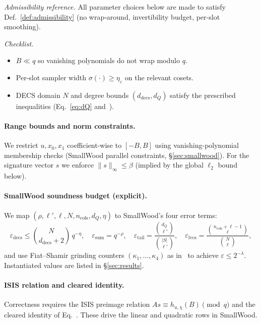 \noindent\emph{Admissibility reference.}
All parameter choices below are made to satisfy Def.~\ref{def:admissibility} (no wrap‑around, invertibility budget, per‑slot smoothing).

\noindent\emph{Checklist.}
\begin{itemize}[leftmargin=1.25em]
  \item $B \ll q$ so vanishing polynomials do not wrap modulo $q$.
  \item Per-slot sampler width $\sigma(\cdot)\ge \eta_\varepsilon$ on the relevant cosets.
  \item DECS domain $N$ and degree bounds $(d_{\mathrm{decs}},d_Q)$ satisfy the prescribed inequalities (Eq.~\eqref{eq:dQ} and~\cite{cryptoeprint:2025/1085}).
\end{itemize}

\paragraph{Range bounds and norm constraints.}
We restrict $u,x_0,x_1$ coefficient-wise to $[-B,B]$ using vanishing-polynomial membership checks (SmallWood parallel constraints, \S\ref{sec:smallwood}). For the signature vector $s$ we enforce $\|s\|_\infty\le \beta$ (implied by the global $\ell_2$ bound below).

\paragraph{SmallWood soundness budget (explicit).}
We map $(\rho,\ell',\ell,N,n_{\mathrm{cols}},d_Q,\eta)$ to SmallWood’s four error terms:
\[
\varepsilon_{\mathrm{decs}}\le \binom{N}{d_{\mathrm{decs}}+2}\,q^{-\eta},\quad
\varepsilon_{\mathrm{sum}}=q^{-\rho},\quad
\varepsilon_{\mathrm{tail}}=\frac{\binom{d_Q}{\ell'}}{\binom{|S|}{\ell'}},\quad
\varepsilon_{\mathrm{lvcs}}=\frac{\binom{n_{\mathrm{cols}}+\ell-1}{\ell}}{\binom{N}{\ell}},
\]
and use Fiat–Shamir grinding counters $(\kappa_1,\dots,\kappa_4)$ as in~\cite{cryptoeprint:2025/1085} to achieve $\varepsilon\le 2^{-\lambda}$. Instantiated values are listed in \S\ref{sec:results}.

\paragraph{ISIS relation and cleared identity.}
Correctness requires the ISIS preimage relation $A s\equiv h_{u,\chi}(B)\pmod q$ and the cleared identity of Eq.~. These drive the linear and quadratic rows in SmallWood.

